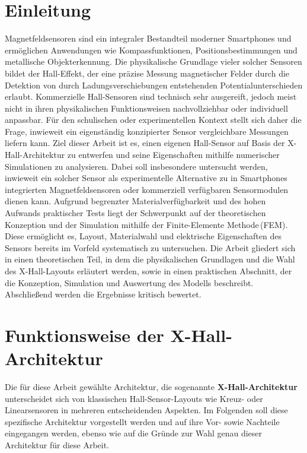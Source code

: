 \documentclass[12pt, a4paper]{article}
\begin{document}
\section{Einleitung}
Magnetfeldsensoren sind ein integraler Bestandteil moderner Smartphones und ermöglichen Anwendungen wie Kompassfunktionen, Positionsbestimmungen und metallische Objekterkennung. Die physikalische Grundlage vieler solcher Sensoren bildet der Hall-Effekt, der eine präzise Messung magnetischer Felder durch die Detektion von durch Ladungsverschiebungen entstehenden Potentialunterschieden erlaubt.\newline
Kommerzielle Hall-Sensoren sind technisch sehr ausgereift, jedoch meist nicht in ihren physikalischen Funktionsweisen nachvollziehbar oder individuell anpassbar. Für den schulischen oder experimentellen Kontext stellt sich daher die Frage, inwieweit ein eigenständig konzipierter Sensor vergleichbare Messungen liefern kann.\newline
Ziel dieser Arbeit ist es, einen eigenen Hall-Sensor auf Basis der X-Hall-Architektur zu entwerfen und seine Eigenschaften mithilfe numerischer Simulationen zu analysieren. Dabei soll insbesondere untersucht werden, inwieweit ein solcher Sensor als experimentelle Alternative zu in Smartphones integrierten Magnetfeldsensoren oder kommerziell verfügbaren Sensormodulen dienen kann.\newline
Aufgrund begrenzter Materialverfügbarkeit und des hohen Aufwands praktischer Tests liegt der Schwerpunkt auf der theoretischen Konzeption und der Simulation mithilfe der Finite-Elemente Methode\,(FEM). Diese ermöglicht es, Layout, Materialwahl und elektrische Eigenschaften des Sensors bereits im Vorfeld systematisch zu untersuchen.\newline
Die Arbeit gliedert sich in einen theoretischen Teil, in dem die physikalischen Grundlagen und die Wahl des X-Hall-Layouts erläutert werden, sowie in einen praktischen Abschnitt, der die Konzeption, Simulation und Auswertung des Modells beschreibt. Abschließend werden die Ergebnisse kritisch bewertet.


\section{Funktionsweise der X-Hall-Architektur}
Die für diese Arbeit gewählte Architektur, die sogenannte \textbf{X-Hall-Architektur} unterscheidet sich von klassischen Hall-Sensor-Layouts wie Kreuz- oder Linearsensoren in mehreren entscheidenden Aspekten. Im Folgenden soll diese spezifische Architektur vorgestellt werden und auf ihre Vor- sowie Nachteile eingegangen werden, ebenso wie auf die Gründe zur Wahl genau dieser %
Architektur für diese Arbeit.
\end{document}
